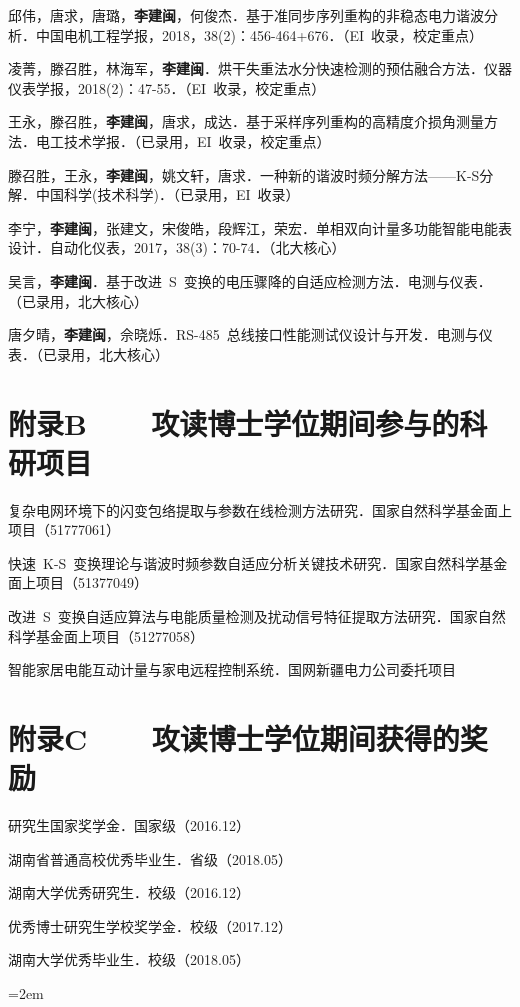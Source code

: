 \begin{publist}
	\item 邱伟，唐求，唐璐，\textbf{李建闽}，何俊杰．基于准同步序列重构的非稳态电力谐波分析．中国电机工程学报，2018，38(2)：456-464+676．（EI~收录，校定重点）
	\item 凌菁，滕召胜，林海军，\textbf{李建闽}．烘干失重法水分快速检测的预估融合方法．仪器仪表学报，2018(2)：47-55．（EI~收录，校定重点）
	\item 王永，滕召胜，\textbf{李建闽}，唐求，成达．基于采样序列重构的高精度介损角测量方法．电工技术学报．（已录用，EI~收录，校定重点）
	\item 滕召胜，王永，\textbf{李建闽}，姚文轩，唐求．一种新的谐波时频分解方法——K-S分解．中国科学(技术科学)．（已录用，EI~收录）
	\item 李宁，\textbf{李建闽}，张建文，宋俊皓，段辉江，荣宏．单相双向计量多功能智能电能表设计．自动化仪表，2017，38(3)：70-74．（北大核心）
	\item 吴言，\textbf{李建闽}．基于改进~S~变换的电压骤降的自适应检测方法．电测与仪表．（已录用，北大核心）
	\item 唐夕晴，\textbf{李建闽}，佘晓烁．RS-485~总线接口性能测试仪设计与开发．电测与仪表．（已录用，北大核心）
\end{publist}
\chapter*{附录B~~~~攻读博士学位期间参与的科研项目}
\setlength{\parindent}{0em}
\begin{publist}
	\item	复杂电网环境下的闪变包络提取与参数在线检测方法研究．国家自然科学基金面上项目（51777061）
	\item	快速~K-S~变换理论与谐波时频参数自适应分析关键技术研究．国家自然科学基金面上项目（51377049）
	\item	改进~S~变换自适应算法与电能质量检测及扰动信号特征提取方法研究．国家自然科学基金面上项目（51277058）
	\item	智能家居电能互动计量与家电远程控制系统．国网新疆电力公司委托项目
\end{publist}
\chapter*{附录C~~~~攻读博士学位期间获得的奖励}
\setlength{\parindent}{0em}
\begin{publist}
	\item	研究生国家奖学金．国家级（2016.12）
	\item	湖南省普通高校优秀毕业生．省级（2018.05）
	\item	湖南大学优秀研究生．校级（2016.12）
	\item	优秀博士研究生学校奖学金．校级（2017.12）
	\item	湖南大学优秀毕业生．校级（2018.05）
\end{publist}
\vfill
{}\hangindent=2em\noindent

\setlength{\parindent}{2em}
